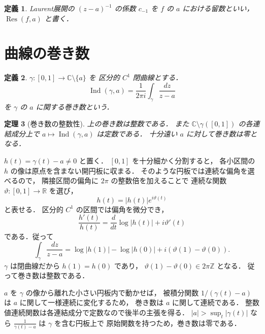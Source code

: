 \documentclass[a5paper,10pt,onecolumn]{jsarticle}
\makeatletter
\theoremstyle{mathnotetheorem}
\newtheorem{theorem}{定理}[section]
\newtheorem{definition}[theorem]{定義}
\renewcommand{\proofname}{証明}
\renewenvironment{proof}[1][\proofname]{%
  \par\pushQED{\qed}\normalfont\topsep4\p@\@plus2\p@\relax
  \trivlist\item[\hskip\labelsep\bfseries #1]\ignorespaces
}{\popQED\endtrivlist\@endpefalse}
\makeatother
\begin{document}
\begin{definition}
Laurent展開の $(z-a)^{-1}$ の係数 $c_{-1}$ を
$f$ の $a$ における\emph{留数}といい，
$\operatorname{Res}(f,a)$ と書く．
\end{definition}

\section{曲線の巻き数}

\begin{definition}
$\gamma:[0,1]\to\mathbb C\setminus\{a\}$ を
区分的 $C^1$ 閉曲線とする．
\[
 \operatorname{Ind}(\gamma,a)
 =\frac1{2\pi i}\int_\gamma\frac{dz}{z-a}
\]
を $\gamma$ の $a$ に関する巻き数という．
\end{definition}

\begin{theorem}[巻き数の整数性]\label{thm:index-int}
上の巻き数は整数である．
また $\mathbb C\setminus\gamma([0,1])$ の各連結成分上で
$a\mapsto\operatorname{Ind}(\gamma,a)$ は定数である．
十分遠い $a$ に対して巻き数は零となる．
\end{theorem}
\begin{proof}
$h(t)=\gamma(t)-a\ne0$ と置く．
$[0,1]$ を十分細かく分割すると，
各小区間の $h$ の像は原点を含まない開円板に収まる．
そのような円板では連続な偏角を選べるので，
隣接区間の偏角に $2\pi$ の整数倍を加えることで
連続な関数 $\vartheta:[0,1]\to\mathbb R$ を選び，
\[
 h(t)=|h(t)|e^{i\vartheta(t)}
\]
と表せる．
区分的 $C^1$ の区間では偏角を微分でき，
\[
 \frac{h'(t)}{h(t)}
 =\frac d{dt}\log|h(t)|+i\vartheta'(t)
\]
である．従って
\[
 \int_\gamma\frac{dz}{z-a}
 =\log|h(1)|-\log|h(0)|
   +i(\vartheta(1)-\vartheta(0)).
\]
$\gamma$ は閉曲線だから $h(1)=h(0)$ であり，
$\vartheta(1)-\vartheta(0)\in2\pi\mathbb Z$ となる．
従って巻き数は整数である．

$a$ を $\gamma$ の像から離れた小さい円板内で動かせば，
被積分関数 $1/(\gamma(t)-a)$ は $a$ に関して一様連続に変化するため，
巻き数は $a$ に関して連続である．
整数値連続関数は各連結成分で定数なので後半の主張を得る．
$|a|>\sup_t|\gamma(t)|$ なら
$\frac1{\gamma(t)-a}$ は $\gamma$ を含む円板上で
原始関数を持つため，巻き数は零である．
\end{proof}
\end{document}
